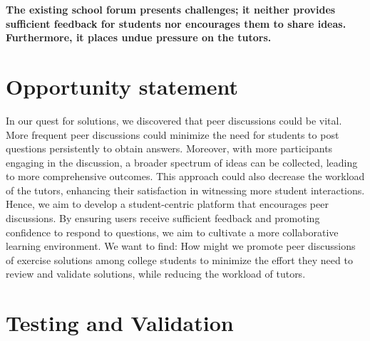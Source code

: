 \documentclass[a4paper]{article}
\begin{document}
    \textbf{The existing school forum presents challenges; it neither provides sufficient feedback for students nor encourages them to share ideas.
    Furthermore, it places undue pressure on the tutors.}


    \section*{Opportunity statement}
    In our quest for solutions, we discovered that peer discussions could be vital.
    More frequent peer discussions could minimize the need for students to post questions persistently to obtain answers.
    Moreover, with more participants engaging in the discussion, a broader spectrum of ideas can be collected, leading to more comprehensive outcomes.
    This approach could also decrease the workload of the tutors, enhancing their satisfaction in witnessing more student interactions.\\

    Hence, we aim to develop a student-centric platform that encourages peer discussions.
    By ensuring users receive sufficient feedback and promoting confidence to respond to questions, we aim to cultivate a more collaborative learning environment.
    We want to find: How might we promote peer discussions of exercise solutions among college students to minimize the effort they need to review and validate solutions,
    while reducing the workload of tutors.

    \section*{Testing and Validation}
\end{document}
